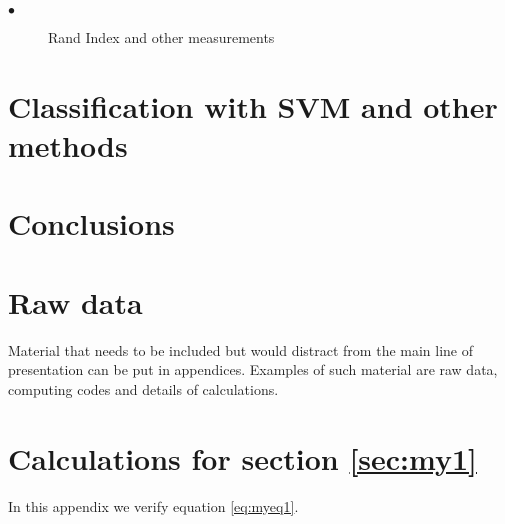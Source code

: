 \documentclass{uonmathreport}
\begin{document}
\begin{description}
  \item[$\bullet$] Rand Index and other measurements
\end{description}



\section{Classification with SVM and other methods} \label{sec:Classification}



\section{Conclusions} \label{sec:conclusions}



\newpage

\appendix

\section{Raw data} \label{app:rawdata}

Material that needs to be included but would distract from the main
line of presentation can be put in appendices.
Examples of such material are raw
data, computing codes and details of calculations.


\section{Calculations for section \ref{sec:my1}} \label{app:calculations}

In this appendix we verify equation \eqref{eq:myeq1}.

\newpage
\end{document}
